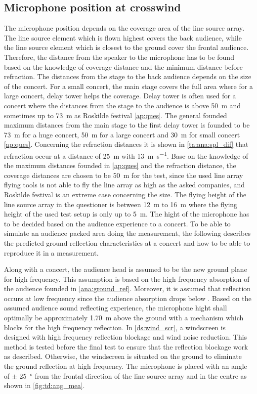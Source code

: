 \subsection{Microphone position at crosswind}
The microphone position depends on the coverage area of the line source array. The line source element which is flown highest covers the back audience, while the line source element which is closest to the ground cover the frontal audience. Therefore, the distance from the speaker to the microphone has to be found based on the knowledge of coverage distance and the minimum distance before refraction. The distances from the stage to the back audience depends on the size of the concert. For a small concert, the main stage covers the full area where for a large concert, delay tower helps the coverage. Delay tower is often used for a concert where the distances from the stage to the audience is above \SI{50}{\meter} and sometimes up to \SI{73}{\meter} as Roskilde festival \autoref{ap:ques}. The general founded maximum distances from the main stage to the first delay tower is founded to be \SI{73}{\meter} for a huge concert, \SI{50}{\meter} for a large concert and \SI{30}{\meter} for small concert \autoref{ap:ques}. 
Concerning the refraction distances it is shown in \autoref{ta:ana:spl_dif} that refraction occur at a distance of \SI{25}{\meter} with \SI{13}{\meter\per\second}.
Base on the knowledge of the maximum distances founded in \autoref{ap:ques} and the refraction distance, the coverage distances are chosen to be \SI{50}{\meter} for the test, since the used line array flying tools is not able to fly the line array as high as the asked companies, and Roskilde festival is an extreme case concerning the size. The flying height of the line source array in the questioner is between \SI{12}{\meter} to \SI{16}{\meter} where the flying height of the used test setup is only up to \SI{5}{\meter}.  
The hight of the microphone has to be decided based on the audience experience to a concert. To be able to simulate an audience packed area doing the measurement, the following describes the predicted ground reflection characteristics at a concert and how to be able to reproduce it in a measurement. 

Along with a concert, the audience head is assumed to be the new ground plane for high frequency. This assumption is based on the high frequency absorption of the audience founded in \autoref{ana:ground_ref}. Moreover, it is assumed that reflection occurs at low frequency since the audience absorption drops below . Based on the assumed audience sound reflecting experience, the microphone hight shall optimally be approximately \SI{1.70}{\meter} above the ground with a mechanism which blocks for the high frequency reflection. In \autoref{ds:wind_scr}, a windscreen is designed with high frequency reflection blockage and wind noise reduction. This method is tested before the final test to ensure that the reflection blockage work as described. Otherwise, the windscreen is situated on the ground to eliminate the ground reflection at high frequency. The microphone is placed with an angle of $\pm$ \SI{25}{\degree} from the frontal direction of the line source array and in the centre as shown in \autoref{fig:td:ang_mea}.

